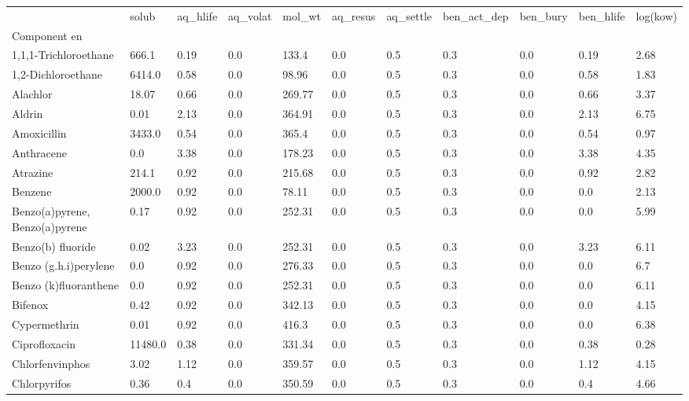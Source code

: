 \begin{tabular}{lllllllllll}
 & solub & aq_hlife & aq_volat & mol_wt & aq_resus & aq_settle & ben_act_dep & ben_bury & ben_hlife & log(kow) \\
Component en &  &  &  &  &  &  &  &  &  &  \\
1,1,1-Trichloroethane & 666.1 & 0.19 & 0.0 & 133.4 & 0.0 & 0.5 & 0.3 & 0.0 & 0.19 & 2.68 \\
\cline{1-11}
1,2-Dichloroethane & 6414.0 & 0.58 & 0.0 & 98.96 & 0.0 & 0.5 & 0.3 & 0.0 & 0.58 & 1.83 \\
\cline{1-11}
Alachlor & 18.07 & 0.66 & 0.0 & 269.77 & 0.0 & 0.5 & 0.3 & 0.0 & 0.66 & 3.37 \\
\cline{1-11}
Aldrin & 0.01 & 2.13 & 0.0 & 364.91 & 0.0 & 0.5 & 0.3 & 0.0 & 2.13 & 6.75 \\
\cline{1-11}
Amoxicillin & 3433.0 & 0.54 & 0.0 & 365.4 & 0.0 & 0.5 & 0.3 & 0.0 & 0.54 & 0.97 \\
\cline{1-11}
Anthracene & 0.0 & 3.38 & 0.0 & 178.23 & 0.0 & 0.5 & 0.3 & 0.0 & 3.38 & 4.35 \\
\cline{1-11}
Atrazine & 214.1 & 0.92 & 0.0 & 215.68 & 0.0 & 0.5 & 0.3 & 0.0 & 0.92 & 2.82 \\
\cline{1-11}
Benzene & 2000.0 & 0.92 & 0.0 & 78.11 & 0.0 & 0.5 & 0.3 & 0.0 & 0.0 & 2.13 \\
\cline{1-11}
Benzo(a)pyrene, Benzo(a)pyrene & 0.17 & 0.92 & 0.0 & 252.31 & 0.0 & 0.5 & 0.3 & 0.0 & 0.0 & 5.99 \\
\cline{1-11}
Benzo(b) fluoride & 0.02 & 3.23 & 0.0 & 252.31 & 0.0 & 0.5 & 0.3 & 0.0 & 3.23 & 6.11 \\
\cline{1-11}
Benzo (g.h.i)perylene & 0.0 & 0.92 & 0.0 & 276.33 & 0.0 & 0.5 & 0.3 & 0.0 & 0.0 & 6.7 \\
\cline{1-11}
Benzo (k)fluoranthene  & 0.0 & 0.92 & 0.0 & 252.31 & 0.0 & 0.5 & 0.3 & 0.0 & 0.0 & 6.11 \\
\cline{1-11}
Bifenox & 0.42 & 0.92 & 0.0 & 342.13 & 0.0 & 0.5 & 0.3 & 0.0 & 0.0 & 4.15 \\
\cline{1-11}
Cypermethrin & 0.01 & 0.92 & 0.0 & 416.3 & 0.0 & 0.5 & 0.3 & 0.0 & 0.0 & 6.38 \\
\cline{1-11}
Ciprofloxacin & 11480.0 & 0.38 & 0.0 & 331.34 & 0.0 & 0.5 & 0.3 & 0.0 & 0.38 & 0.28 \\
\cline{1-11}
Chlorfenvinphos & 3.02 & 1.12 & 0.0 & 359.57 & 0.0 & 0.5 & 0.3 & 0.0 & 1.12 & 4.15 \\
\cline{1-11}
Chlorpyrifos & 0.36 & 0.4 & 0.0 & 350.59 & 0.0 & 0.5 & 0.3 & 0.0 & 0.4 & 4.66 \\

\end{tabular}
